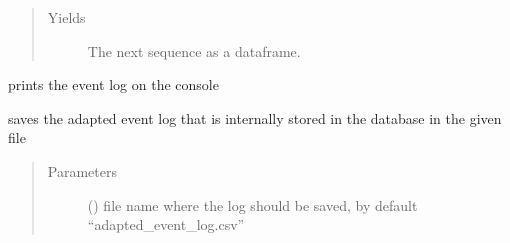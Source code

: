 \documentclass[letterpaper,10pt,english]{sphinxmanual}
\begin{document}
\begin{fulllineitems}
\begin{fulllineitems}
\begin{quote}
\begin{description}
\begin{itemize}
\end{itemize}

\item[{Yields}] \leavevmode
\sphinxAtStartPar
{} \textendash{} The next sequence as a dataframe.

\end{description}\end{quote}

\end{fulllineitems}


\begin{fulllineitems}
\label{\detokenize{event_log_analyzer:event_log_analyzer.event_log.EventLogStorage.print_event_log}}
\sphinxAtStartPar
prints the event log on the console

\end{fulllineitems}


\begin{fulllineitems}
\label{\detokenize{event_log_analyzer:event_log_analyzer.event_log.EventLogStorage.save_adapted_event_log}}
\sphinxAtStartPar
saves the adapted event log that is internally stored in the database in the given file
\begin{quote}\begin{description}
\item[{Parameters}] \leavevmode
\sphinxAtStartPar
{} (\sphinxstyleliteralemphasis{\sphinxupquote{, }}) \textendash{} file name where the log should be saved, by default “adapted\_event\_log.csv”

\end{description}\end{quote}

\end{fulllineitems}


\end{fulllineitems}
\end{document}

